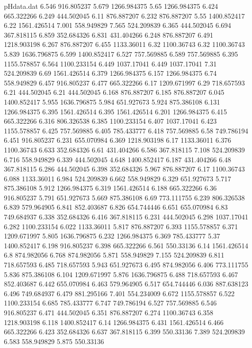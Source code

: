 \begin{filecontents}{pHdata.dat}
6.546	916.805237
5.679	1266.984375
5.65	1266.984375
6.424	665.322266
6.249	444.502045
6.11	876.887207
6.232	876.887207
5.55	1400.852417
6.22	1561.426514
7.001	558.949829
7.565	524.209839
6.365	444.502045
6.694	367.818115
6.859	352.684326
6.831	431.404266
6.248	876.887207
6.491	1218.903198
6.267	876.887207
6.455	1133.36011
6.32	1100.36743
6.32	1100.36743
5.839	1636.796875
6.599	1400.852417
6.527	757.569885
6.589	757.569885
6.395	1155.578857
6.564	1100.233154
6.449	1037.17041
6.449	1037.17041
7.31	524.209839
6.69	1561.426514
6.379	1266.984375
6.157	1266.984375
6.74	558.949829
6.457	916.805237
6.477	665.322266
6.17	1209.671997
6.29	718.657593
6.21	444.502045
6.21	444.502045
6.168	876.887207
6.185	876.887207
6.045	1400.852417
5.955	1636.796875
5.984	651.927673
5.924	875.386108
6.131	1266.984375
6.395	1561.426514
6.395	1561.426514
6.201	1266.984375
6.415	665.322266
6.316	806.326538
6.385	1100.233154
6.407	1037.17041
6.423	1155.578857
6.425	757.569885
6.405	785.433777
6.418	757.569885
6.58	749.786194
6.451	916.805237
6.231	655.070984
6.369	1218.903198
6.17	1133.36011
6.376	1100.36743
6.633	352.684326
6.61	431.404266
6.586	367.818115
7.108	524.209839
6.716	558.949829
6.339	444.502045
4.648	1400.852417
6.187	431.404266
6.48	367.818115
6.286	444.502045
6.398	352.684326
5.967	876.887207
6.17	1100.36743
6.088	1133.36011
6.984	524.209839
6.662	558.949829
6.329	651.927673
5.717	875.386108
5.912	1266.984375
6.319	1561.426514
6.188	665.322266
6.36	916.805237
5.791	651.927673
5.669	875.386108
6.69	773.111755
6.239	806.326538
6.839	579.964905
6.841	852.403687
6.826	654.744446
6.651	655.070984
6.83	749.684937
6.338	352.684326
6.416	367.818115
6.231	444.502045
6.298	1037.17041
6.282	1100.233154
6.022	1133.36011
5.817	876.887207
6.393	1155.578857
6.371	1209.671997
5.805	1636.796875
6.232	1266.984375
6.369	785.433777
5.37	1400.852417
6.198	916.805237
6.398	665.322266
6.561	550.33136
6.14	1561.426514
6.8	874.982056
6.768	874.982056
5.871	558.949829
7.155	524.209839
6.811	718.657593
6.485	718.657593
5.943	651.927673
6.495	874.982056
6.406	773.111755
5.836	875.386108
6.104	1209.671997
5.876	1636.796875
6.488	718.657593
6.467	852.403687
6.442	655.070984
6.463	579.964905
6.517	654.744446
6.036	887.638123
6.496	749.684937
6.479	881.295166
7.401	554.234009
6.672	1155.578857
6.522	1100.233154
6.685	785.433777
6.747	749.786194
6.527	757.569885
6.546	916.805237
6.471	444.502045
6.351	876.887207
6.274	1100.36743
6.358	1218.903198
6.118	1400.852417
6.14	1266.984375
6.431	1561.426514
6.466	665.322266
6.423	352.684326
6.637	367.818115
6.399	550.33136
7.389	524.209839
6.583	558.949829
5.875	550.33136

\end{filecontents}
